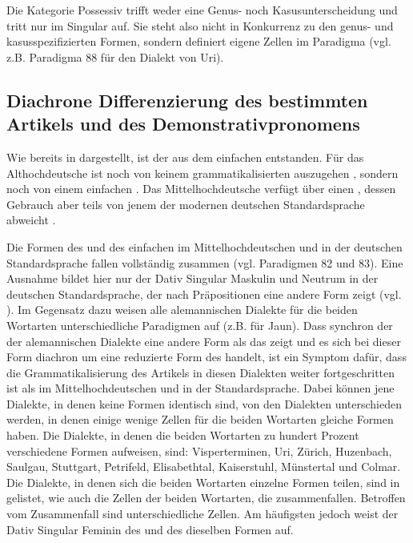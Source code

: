 Die Kategorie Possessiv trifft weder eine Genus- noch Kasusunterscheidung und tritt nur im Singular auf. Sie steht also nicht in Konkurrenz zu den genus- und kasusspezifizierten Formen, sondern definiert eigene Zellen im Paradigma (vgl. z.B. Paradigma 88 für den Dialekt von Uri).

\subsection{Diachrone Differenzierung des bestimmten Artikels und des Demonstrativpronomens}\label{5.5.3}

Wie bereits in  dargestellt, ist der  aus dem einfachen  entstanden. Für das Althochdeutsche ist noch von keinem grammatikalisierten  auszugehen \citep[24]{Schrodt2004}, sondern noch von einem einfachen . Das Mittelhochdeutsche verfügt über einen , dessen Gebrauch aber teils von jenem der modernen deutschen Standardsprache abweicht \citep[380-381]{Paul2007}.

Die Formen des  und des einfachen  im Mittelhochdeutschen und in der deutschen Standardsprache fallen vollständig zusammen (vgl. Paradigmen 82 und 83). Eine Ausnahme bildet hier nur der Dativ Singular Maskulin und Neutrum in der deutschen Standardsprache, der nach Präpositionen eine andere Form zeigt (vgl. ). Im Gegensatz dazu weisen alle alemannischen Dialekte für die beiden Wortarten unterschiedliche Paradigmen auf (z.B.  für Jaun). Dass synchron der  der alemannischen Dialekte eine andere Form als das  zeigt und es sich bei dieser Form diachron um eine reduzierte Form des  handelt, ist ein Symptom dafür, dass die Grammatikalisierung des Artikels in diesen Dialekten weiter fortgeschritten ist als im Mittelhochdeutschen und in der Standardsprache. Dabei können jene Dialekte, in denen keine Formen identisch sind, von den Dialekten unterschieden werden, in denen einige wenige Zellen für die beiden Wortarten gleiche Formen haben. Die Dialekte, in denen die beiden Wortarten zu hundert Prozent verschiedene Formen aufweisen, sind: Visperterminen, Uri, Zürich, Huzenbach, Saulgau, Stuttgart, Petrifeld, Elisabethtal, Kaiserstuhl, Münstertal und Colmar. Die Dialekte, in denen sich die beiden Wortarten einzelne Formen teilen, sind in  gelistet, wie auch die Zellen der beiden Wortarten, die zusammenfallen. Betroffen vom Zusammenfall sind unterschiedliche Zellen. Am häufigsten jedoch weist der Dativ Singular Feminin des  und des  dieselben Formen auf.

